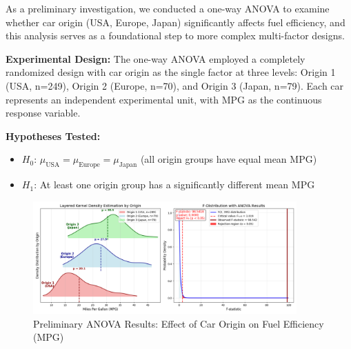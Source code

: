 \documentclass[12pt]{article}
\begin{document}
As a preliminary investigation, we conducted a one-way ANOVA to examine whether car origin (USA, Europe, Japan) 
significantly affects fuel efficiency, and this analysis serves as a foundational step to more complex multi-factor designs.

\textbf{Experimental Design:} The one-way ANOVA employed a completely randomized design with car origin 
as the single factor at three levels: Origin 1 (USA, n=249), Origin 2 (Europe, n=70), and Origin 3 (Japan, n=79). 
Each car represents an independent experimental unit, with MPG as the continuous response variable.

\textbf{Hypotheses Tested:}
\begin{itemize}
    \item $H_0$: $\mu_{\text{USA}} = \mu_{\text{Europe}} = \mu_{\text{Japan}}$ (all origin groups have equal mean MPG)
    \item $H_1$: At least one origin group has a significantly different mean MPG
\end{itemize}


\begin{figure}[!h]
    \centering
    \includegraphics[width=0.9\textwidth]{../results/anova_origin_mpg.png}
    \caption{Preliminary ANOVA Results: Effect of Car Origin on Fuel Efficiency (MPG)}
    \label{fig:preliminary_anova}
\end{figure}
\end{document}
